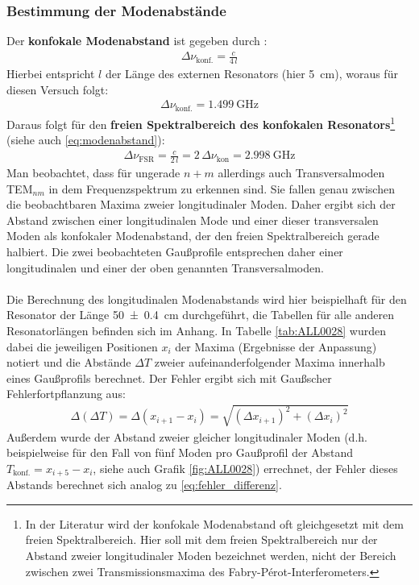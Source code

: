 \documentclass[11pt, a4paper]{article}
\numberwithin{equation}{section}
\begin{document}
\subsubsection{Bestimmung der Modenabstände}
Der \textbf{konfokale Modenabstand} ist gegeben durch \cite{siegman}:
\begin{align}
\Delta\nu_\text{konf.}=\frac{c}{4\,l}
\end{align}
Hierbei entspricht $l$ der Länge des externen Resonators (hier \SI{5}{\centi\metre}), woraus für diesen Versuch folgt:
\begin{align}
\Delta\nu_\text{konf.}=\SI{1.499}{\giga\hertz}
\end{align}
Daraus folgt für den \textbf{freien Spektralbereich des konfokalen Resonators}\footnote{In der Literatur wird der konfokale Modenabstand oft gleichgesetzt mit dem freien Spektralbereich. Hier soll mit dem freien Spektralbereich nur der Abstand zweier longitudinaler Moden bezeichnet werden, nicht der Bereich zwischen zwei Transmissionsmaxima des Fabry-Pérot-Interferometers.} (siehe auch \eqref{eq:modenabstand}):
\begin{align}
\Delta\nu_\text{FSR}=\frac{c}{2\,l}=2\,\Delta\nu_\text{kon}=\SI{2.998}{\giga\hertz}
\end{align}
Man beobachtet, dass für ungerade $n+m$ allerdings auch Transversalmoden TEM$_{nm}$ in dem Frequenzspektrum zu erkennen sind.
Sie fallen genau zwischen die beobachtbaren Maxima zweier longitudinaler Moden.
Daher ergibt sich der Abstand zwischen einer longitudinalen Mode und einer dieser transversalen Moden als konfokaler Modenabstand, der den freien Spektralbereich gerade halbiert.
Die zwei beobachteten Gaußprofile entsprechen daher einer longitudinalen und einer der oben genannten Transversalmoden.\\
\\
Die Berechnung des longitudinalen Modenabstands wird hier beispielhaft für den Resonator der Länge \SI{50+-0.4}{\centi\metre} durchgeführt, die Tabellen für alle anderen Resonatorlängen befinden sich im Anhang.
In Tabelle \ref{tab:ALL0028} wurden dabei die jeweiligen Positionen $x_i$ der Maxima (Ergebnisse der Anpassung) notiert und die Abstände $\Delta T$ zweier aufeinanderfolgender Maxima innerhalb eines Gaußprofils berechnet.
Der Fehler ergibt sich mit Gaußscher Fehlerfortpflanzung aus:
\begin{align}
\Delta(\Delta T)=\Delta(x_{i+1}-x_i)=\sqrt{(\Delta x_{i+1})^2+(\Delta x_i)^2}
\label{eq:fehler_differenz}
\end{align}
Außerdem wurde der Abstand zweier gleicher longitudinaler Moden (d.h. beispielweise für den Fall von fünf Moden pro Gaußprofil der Abstand $T_\text{konf.}=x_{i+5}-x_i$, siehe auch Grafik \ref{fig:ALL0028}) errechnet, der Fehler dieses Abstands berechnet sich analog zu \eqref{eq:fehler_differenz}.
\end{document}
